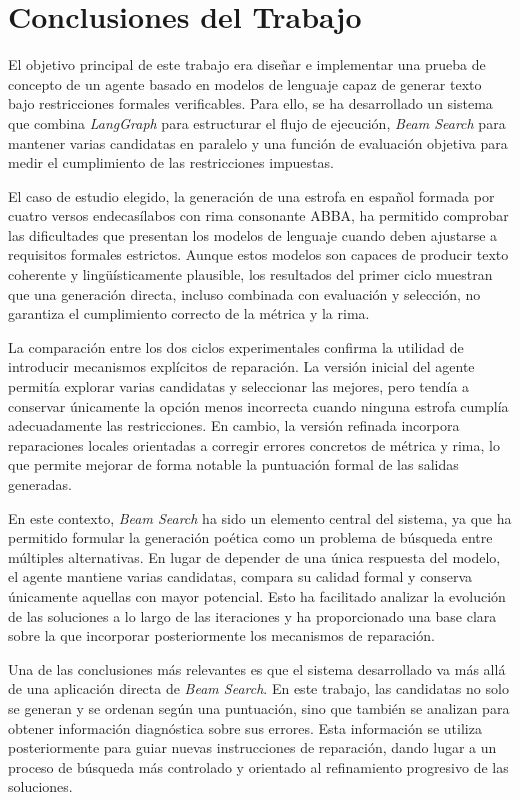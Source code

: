 \documentclass[12pt,a4paper,twoside,openright]{book}
\begin{document}
\section{Conclusiones del Trabajo}

El objetivo principal de este trabajo era diseñar e implementar una prueba de concepto de un agente basado en modelos de lenguaje capaz de generar texto bajo restricciones formales verificables.
Para ello, se ha desarrollado un sistema que combina \emph{LangGraph} para estructurar el flujo de ejecución, \emph{Beam Search} para mantener varias candidatas en paralelo y una función de evaluación
objetiva para medir el cumplimiento de las restricciones impuestas.

El caso de estudio elegido, la generación de una estrofa en español formada por cuatro versos endecasílabos con rima consonante ABBA, ha permitido comprobar las dificultades que presentan los modelos de lenguaje
cuando deben ajustarse a requisitos formales estrictos. Aunque estos modelos son capaces de producir texto coherente y lingüísticamente plausible, los resultados del primer ciclo muestran que una generación directa,
incluso combinada con evaluación y selección, no garantiza el cumplimiento correcto de la métrica y la rima.

La comparación entre los dos ciclos experimentales confirma la utilidad de introducir mecanismos explícitos de reparación. La versión inicial del agente permitía explorar varias candidatas y seleccionar las mejores,
pero tendía a conservar únicamente la opción menos incorrecta cuando ninguna estrofa cumplía adecuadamente las restricciones. En cambio, la versión refinada incorpora reparaciones locales orientadas a corregir errores
concretos de métrica y rima, lo que permite mejorar de forma notable la puntuación formal de las salidas generadas.

En este contexto, \emph{Beam Search} ha sido un elemento central del sistema, ya que ha permitido formular la generación poética como un problema de búsqueda entre múltiples alternativas.
En lugar de depender de una única respuesta del modelo, el agente mantiene varias candidatas, compara su calidad formal y conserva únicamente aquellas con mayor potencial.
Esto ha facilitado analizar la evolución de las soluciones a lo largo de las iteraciones y ha proporcionado una base clara sobre la que incorporar posteriormente los mecanismos de reparación.

Una de las conclusiones más relevantes es que el sistema desarrollado va más allá de una aplicación directa de \emph{Beam Search}. En este trabajo, las candidatas no solo se generan y se ordenan según una puntuación,
sino que también se analizan para obtener información diagnóstica sobre sus errores. Esta información se utiliza posteriormente para guiar nuevas instrucciones de reparación, dando lugar a un proceso de búsqueda más controlado
y orientado al refinamiento progresivo de las soluciones.
\end{document}
